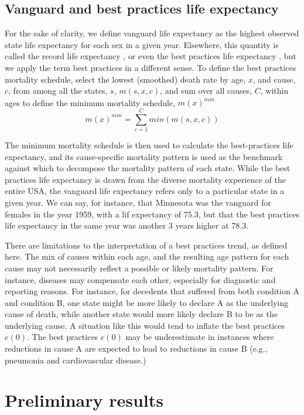 \documentclass[11pt,oneside,a4paper]{article} %
\begin{document}
\subsection*{Vanguard and best practices life expectancy}
For the sake of clarity, we define vanguard life expectancy as the highest
observed state life expectancy for each sex in a given year. Elsewhere, this
quantity is called the record life expectancy \citep{oeppen2002broken}, or even
the best practices life expectancy \citep{sanderson2004putting}, but we apply
the term best practices in a different sense. To define the best practices
mortality schedule, select the lowest (smoothed) death rate by age, $x$,
and cause, $c$, from among all the states, $s$, $m(s,x,c)$, and sum over
all causes, $C$, within ages to define the minimum mortality schedule,
$m(x)^{min}$
\begin{equation}
m(x)^{min} = \sum _{c=1}^C min(m(s,x,c))
\end{equation}

The minimum mortality schedule is then used to calculate the best-practices life
expectancy, and its cause-specific mortality pattern is used as the
benchmark against which to decompose the mortality pattern of each state. While
the best practices life expectancy is drawn from the diverse mortality
experience of the entire USA, the vanguard life expectancy refers only to a
particular state in a given year. We can say, for instance, that Minnesota was
the vanguard for females in the year 1959, with a lif expectancy of 75.3, but
that the best practices life expectancy in the same year was another 3 years
higher at 78.3.

There are limitations to the interpretation of a best practices trend, as
defined here. The mix of causes within each age, and the resulting age pattern
for each cause may not necessarily reflect a possible or likely mortality
pattern. For instance, diseases may compensate each other, especially for
diagnostic and reporting reasons. For instance, for decedents that suffered
from both condition A and condition B, one state might be more likely to
declare A as the underlying cause of death, while another state would more
likely declare B to be as the underlying cause. A situation like this
would tend to inflate the best practices $e(0)$. The best practices $e(0)$ may
be underestimate in instances where reductions in cause A are expected to lead
to reductions in cause B (e.g., pneumonia and cardiovascular disease.)
\FloatBarrier
\section*{Preliminary results}
\FloatBarrier
\end{document}
